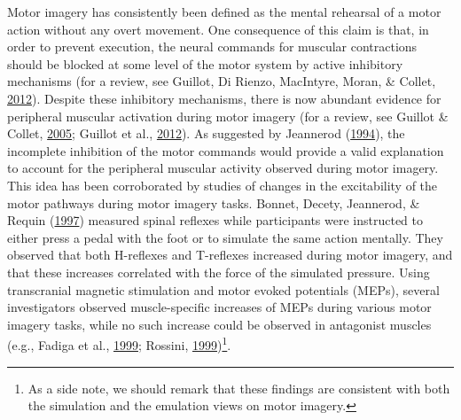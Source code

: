 \documentclass[a4paper,12pt,twoside,openright,oldfontcommands]{memoir}
\let\rmarkdownfootnote\footnote%
\def\footnote{\protect\rmarkdownfootnote}
\begin{document}
Motor imagery has consistently been defined as the mental rehearsal of a
motor action without any overt movement. One consequence of this claim
is that, in order to prevent execution, the neural commands for muscular
contractions should be blocked at some level of the motor system by
active inhibitory mechanisms (for a review, see Guillot, Di Rienzo,
MacIntyre, Moran, \& Collet,
\protect\hyperlink{ref-guillot_imagining_2012}{2012}). Despite these
inhibitory mechanisms, there is now abundant evidence for peripheral
muscular activation during motor imagery (for a review, see Guillot \&
Collet, \protect\hyperlink{ref-guillot_contribution_2005}{2005}; Guillot
et al., \protect\hyperlink{ref-guillot_imagining_2012}{2012}). As
suggested by Jeannerod
(\protect\hyperlink{ref-jeannerod_representing_1994}{1994}), the
incomplete inhibition of the motor commands would provide a valid
explanation to account for the peripheral muscular activity observed
during motor imagery. This idea has been corroborated by studies of
changes in the excitability of the motor pathways during motor imagery
tasks. Bonnet, Decety, Jeannerod, \& Requin
(\protect\hyperlink{ref-bonnet_mental_1997}{1997}) measured spinal
reflexes while participants were instructed to either press a pedal with
the foot or to simulate the same action mentally. They observed that
both H-reflexes and T-reflexes increased during motor imagery, and that
these increases correlated with the force of the simulated pressure.
Using transcranial magnetic stimulation and motor evoked potentials
(MEPs), several investigators observed muscle-specific increases of MEPs
during various motor imagery tasks, while no such increase could be
observed in antagonist muscles (e.g., Fadiga et al.,
\protect\hyperlink{ref-fadiga_corticospinal_1999}{1999}; Rossini,
\protect\hyperlink{ref-rossini_corticospinal_1999}{1999})\footnote{As a
  side note, we should remark that these findings are consistent with
  both the simulation and the emulation views on motor imagery.}.
\end{document}
